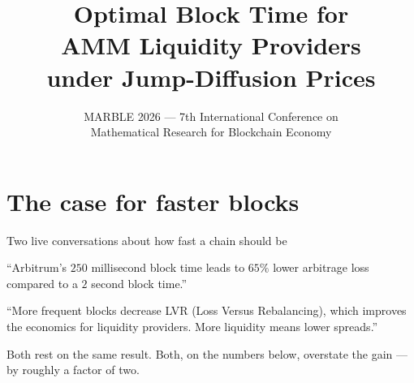 \documentclass[10pt,xcolor=x11names,aspectratio=169]{beamer}
\title{Optimal Block Time for\\ AMM Liquidity Providers\\ under Jump-Diffusion Prices}
\subtitle{MARBLE 2026 --- 7th International Conference on\\ Mathematical Research for Blockchain Economy}
\newcommand{\1}{\mathbf{1}}
\begin{document}
\begin{frame}\titlepage\end{frame}

\section{The case for faster blocks}

\begin{frame}{Two live conversations about how fast a chain should be}
  \begin{rwexample}
    ``Arbitrum's $250$ millisecond block time leads to $65\%$ lower
    arbitrage loss compared to a $2$ second block time.''
  \end{rwexample}
  \begin{rwexample}
    ``More frequent blocks decrease LVR (Loss Versus Rebalancing), which
    improves the economics for liquidity providers. More liquidity means lower
    spreads.''
  \end{rwexample}
  Both rest on the same result. Both, on the numbers below, overstate the gain
  --- by roughly a factor of two.
\end{frame}
\end{document}
